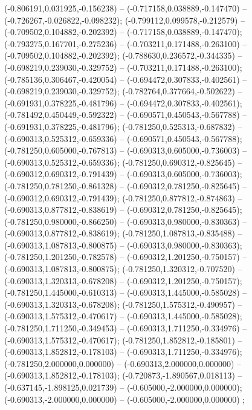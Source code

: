  (-0.806191,0.031925,-0.156238) -- (-0.717158,0.038889,-0.147470) -- (-0.726267,-0.026822,-0.098232);
 (-0.799112,0.099578,-0.212579) -- (-0.709502,0.104882,-0.202392) -- (-0.717158,0.038889,-0.147470);
 (-0.793275,0.167701,-0.275236) -- (-0.703211,0.171488,-0.263100) -- (-0.709502,0.104882,-0.202392);
 (-0.788630,0.236572,-0.344335) -- (-0.698219,0.239030,-0.329752) -- (-0.703211,0.171488,-0.263100);
 (-0.785136,0.306467,-0.420054) -- (-0.694472,0.307833,-0.402561) -- (-0.698219,0.239030,-0.329752);
 (-0.782764,0.377664,-0.502622) -- (-0.691931,0.378225,-0.481796) -- (-0.694472,0.307833,-0.402561);
 (-0.781492,0.450449,-0.592322) -- (-0.690571,0.450543,-0.567788) -- (-0.691931,0.378225,-0.481796);
 (-0.781250,0.525313,-0.687832) -- (-0.690313,0.525312,-0.659336) -- (-0.690571,0.450543,-0.567788);
 (-0.781250,0.605000,-0.767813) -- (-0.690313,0.605000,-0.736003) -- (-0.690313,0.525312,-0.659336);
 (-0.781250,0.690312,-0.825645) -- (-0.690312,0.690312,-0.791439) -- (-0.690313,0.605000,-0.736003);
 (-0.781250,0.781250,-0.861328) -- (-0.690312,0.781250,-0.825645) -- (-0.690312,0.690312,-0.791439);
 (-0.781250,0.877812,-0.874863) -- (-0.690313,0.877812,-0.838619) -- (-0.690312,0.781250,-0.825645);
 (-0.781250,0.980000,-0.866250) -- (-0.690313,0.980000,-0.830363) -- (-0.690313,0.877812,-0.838619);
 (-0.781250,1.087813,-0.835488) -- (-0.690313,1.087813,-0.800875) -- (-0.690313,0.980000,-0.830363);
 (-0.781250,1.201250,-0.782578) -- (-0.690312,1.201250,-0.750157) -- (-0.690313,1.087813,-0.800875);
 (-0.781250,1.320312,-0.707520) -- (-0.690313,1.320313,-0.678208) -- (-0.690312,1.201250,-0.750157);
 (-0.781250,1.445000,-0.610313) -- (-0.690313,1.445000,-0.585028) -- (-0.690313,1.320313,-0.678208);
 (-0.781250,1.575312,-0.490957) -- (-0.690313,1.575312,-0.470617) -- (-0.690313,1.445000,-0.585028);
 (-0.781250,1.711250,-0.349453) -- (-0.690313,1.711250,-0.334976) -- (-0.690313,1.575312,-0.470617);
 (-0.781250,1.852812,-0.185801) -- (-0.690313,1.852812,-0.178103) -- (-0.690313,1.711250,-0.334976);
 (-0.781250,2.000000,0.000000) -- (-0.690313,2.000000,0.000000) -- (-0.690313,1.852812,-0.178103);
 (-0.720873,-1.890567,0.018113) -- (-0.637145,-1.898125,0.021739) -- (-0.605000,-2.000000,0.000000);
 (-0.690313,-2.000000,0.000000) -- (-0.605000,-2.000000,0.000000) ;
